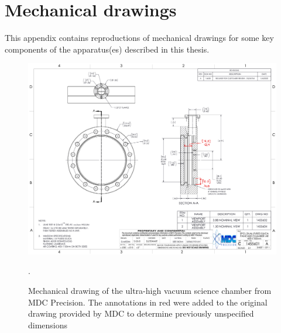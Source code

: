 
\chapter{Mechanical drawings}\label{ch:mech_drawings}

This appendix contains reproductions of mechanical drawings for some key components of the apparatus(es) described in this thesis.

\newpage

\begin{figure}
    \centering
    \includegraphics[width=1\textwidth]{Images/mdc_chamber_20220428.pdf}
    \caption{Mechanical drawing of the ultra-high vacuum science chamber from MDC Precision. The annotations in red were added to the original drawing provided by MDC to determine previously unspecified dimensions}.
    \label{fig:drawing_mdc_chamber}
\end{figure}

\newpage

